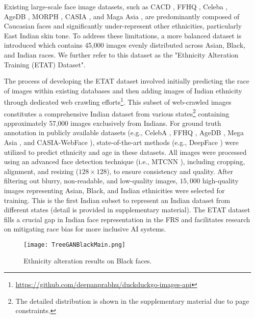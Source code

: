 {	Existing large-scale face image datasets, such as CACD \cite{CACD2014}, FFHQ \cite{StyleGAN2019}, Celeba \cite{celeba}, AgeDB \cite{agedb}, MORPH \cite{MORPH2006}, CASIA \cite{Casia2014}, and Maga Asia \cite{SSRNet2018}, are predominantly composed of Caucasian faces and significantly under-represent other ethnicities, particularly East Indian skin tone.     To address these limitations, a more balanced dataset is introduced which contains 45,000 images evenly distributed across Asian, Black, and Indian races. We further refer to this dataset as the "Ethnicity Alteration Training (ETAT) Dataset".

    
	The process of developing the ETAT dataset involved initially predicting the race of images within existing databases and then adding images of Indian ethnicity through dedicated web crawling efforts\footnote{\url{https://github.com/deepanprabhu/duckduckgo-images-api}}. This subset of web-crawled images constitutes a comprehensive Indian dataset from various states\footnote{The detailed distribution is shown in the supplementary material due to page constraints.} containing approximately 57,000 images exclusively from Indians. For ground truth annotation in publicly available datasets (e.g., CelebA \cite{celeba}, FFHQ \cite{StyleGAN2019}, AgeDB \cite{agedb}, Mega Asia \cite{huang2016unsupervised}, and CASIA-WebFace \cite{Yi2014LearningFR}), state-of-the-art methods (e.g., DeepFace \cite{serengil2021lightface}) were utilized to predict ethnicity and age in these datasets. All images were processed using an advanced face detection technique (i.e., MTCNN \cite{mtcnn}), including cropping, alignment, and resizing ($128 \times 128$), to ensure consistency and quality. After filtering out blurry, non-readable, and low-quality images, $15,000$ high-quality images representing Asian, Black, and Indian ethnicities were selected for training. This is the first Indian subset to represent an Indian dataset from different states (detail is provided in supplementary material). The ETAT dataset fills a crucial gap in Indian face representation in the FRS and facilitates research on mitigating race bias for more inclusive AI systems.


	
	\begin{figure}
		\centering
		\texttt{[image: TreeGANBlackMain.png]}
		\caption{Ethnicity alteration results on Black faces.}
		\label{fig:treeganblack}
		\vspace*{-0.3cm}
	\end{figure}

}
